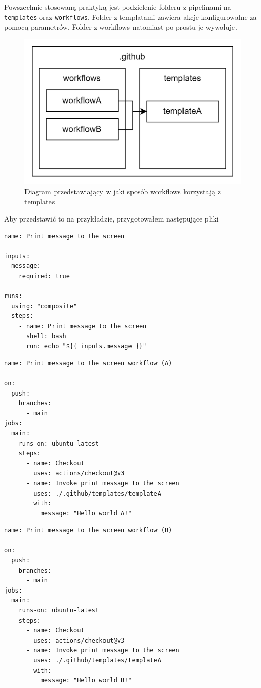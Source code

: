 \documentclass{article}
\begin{document}
Powszechnie stosowaną praktyką jest podzielenie folderu z pipelinami na \lstinline|templates| oraz \lstinline|workflows|. Folder z templatami zawiera akcje konfigurowalne za pomocą parametrów. Folder z workflows natomiast po prostu je wywołuje.

\begin{figure}[H]
    \centering
    \includegraphics[width=0.5\linewidth]{templatesAndWorkflows.png}
    \caption{Diagram przedstawiający w jaki sposób workflows korzystają z templates}
    \label{fig:enter-label}
\end{figure}

Aby przedstawić to na przykładzie, przygotowałem następujące pliki
\begin{lstlisting}[caption=Plik \lstinline|.github/templates/templateA/action.yml|]
name: Print message to the screen

inputs:
  message:
    required: true

runs:
  using: "composite"
  steps:
    - name: Print message to the screen
      shell: bash
      run: echo "${{ inputs.message }}"
\end{lstlisting}

\begin{lstlisting}[caption=Plik \lstinline|.github/workflows/workflowA.yml|]
name: Print message to the screen workflow (A)

on:
  push:
    branches:
      - main
jobs:
  main:
    runs-on: ubuntu-latest
    steps:
      - name: Checkout
        uses: actions/checkout@v3
      - name: Invoke print message to the screen
        uses: ./.github/templates/templateA
        with:
          message: "Hello world A!"
\end{lstlisting}

\begin{lstlisting}[caption=Plik \lstinline|.github/workflows/workflowB.yml|]
name: Print message to the screen workflow (B)

on:
  push:
    branches:
      - main
jobs:
  main:
    runs-on: ubuntu-latest
    steps:
      - name: Checkout
        uses: actions/checkout@v3
      - name: Invoke print message to the screen
        uses: ./.github/templates/templateA
        with:
          message: "Hello world B!"
\end{lstlisting}
\end{document}
